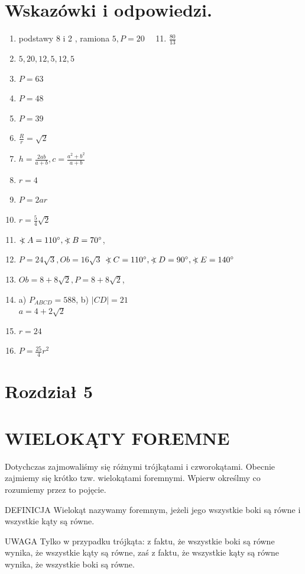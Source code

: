 \documentclass[10pt]{article}
\newcommand\Varangle{\mathop{{<\!\!\!\!\!\text{\small)}}\:}\nolimits}
\begin{document}
\section*{Wskazówki i odpowiedzi.}
\begin{enumerate}
  \item podstawy 8 i 2 , ramiona \(5, P=20 \quad\) 11. \(\frac{80}{13}\)
  \item \(5,20,12,5,12,5\)
  \item \(P=63\)
  \item \(P=48\)
  \item \(P=39\)
  \item \(\frac{R}{r}=\sqrt{2}\)
  \item \(h=\frac{2 a b}{a+b}, c=\frac{a^{2}+b^{2}}{a+b}\)
  \item \(r=4\)
  \item \(P=2 a r\)
  \item \(r=\frac{5}{4} \sqrt{2}\)
  \item \(\Varangle A=110^{\circ}, \Varangle B=70^{\circ}\),
  \item \(P=24 \sqrt{3}, O b=16 \sqrt{3}\) \(\Varangle C=110^{\circ}, \Varangle D=90^{\circ}, \Varangle E=140^{\circ}\)
  \item \(O b=8+8 \sqrt{2}, P=8+8 \sqrt{2}\),
  \item a) \(P_{A B C D}=588\), b) \(|C D|=21\)\\
\(a=4+2 \sqrt{2}\)
  \item \(r=24\)
  \item \(P=\frac{25}{4} r^{2}\)
\end{enumerate}

\section*{Rozdział 5}
\section*{WIELOKĄTY FOREMNE}
Dotychczas zajmowaliśmy się różnymi trójkątami i czworokątami. Obecnie zajmiemy się krótko tzw. wielokątami foremnymi. Wpierw określmy co rozumiemy przez to pojęcie.

DEFINICJA Wielokąt nazywamy foremnym, jeżeli jego wszystkie boki są równe i wszystkie kąty są równe.

UWAGA Tylko w przypadku trójkąta: z faktu, że wszystkie boki są równe wynika, że wszystkie kąty są równe, zaś z faktu, że wszystkie kąty są równe wynika, że wszystkie boki są równe.
\end{document}
